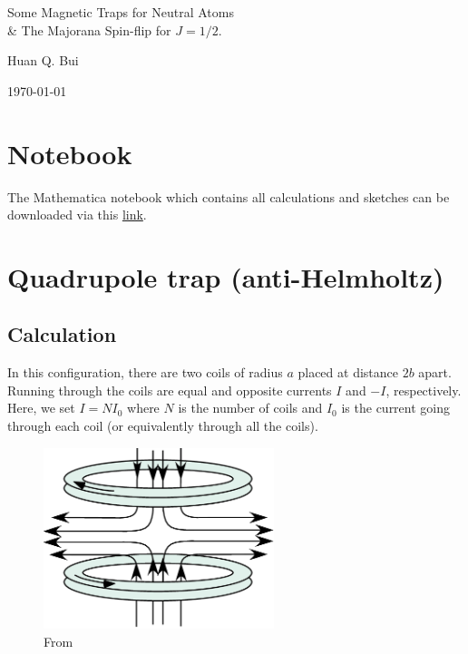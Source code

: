 \documentclass{article}
\theoremstyle{definition}
\begin{document}
	

\begin{center}
	\Large{Some Magnetic Traps for Neutral Atoms \\
	\& The Majorana Spin-flip for $J=1/2$.}
\end{center}	
	
\begin{center}
	\large{Huan Q. Bui}
\end{center}

\begin{center}
	\today
\end{center}



\section{Notebook}
The Mathematica notebook which contains all calculations and sketches can be downloaded via this \href{}{link}. 

\section{Quadrupole trap (anti-Helmholtz)}



\subsection{Calculation}


In this configuration, there are two coils of radius $a$ placed at distance $2b$ apart. Running through the coils are equal and opposite currents $I$ and $-I$, respectively. Here, we set $I = NI_0$ where $N$ is the number of coils and $I_0$ is the current going through each coil (or equivalently through all the coils).

\begin{figure}[!htb]
	\centering
	\includegraphics[width=0.6\textwidth]{antiHelmholtz.png}
	\caption{From \cite{maruyama2003optical}}
\end{figure}
\end{document}
